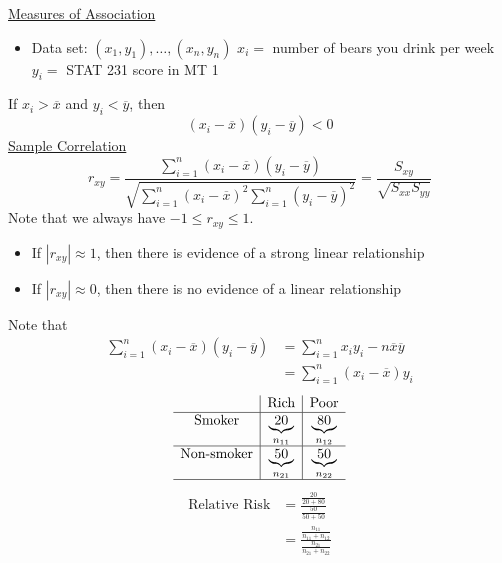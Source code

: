 \underline{Measures of Association}
\begin{itemize}
    \item Data set: $ (x_1,y_1),\ldots ,(x_n,y_n) $
          \subitem $ x_i= $ number of bears you drink per week
          \subitem $ y_i= $ STAT 231 score in MT 1
\end{itemize}
If $ x_i>\overline{x} $ and $ y_i<\overline{y} $, then
\[ (x_i-\overline{x})(y_i-\overline{y})<0 \]
\underline{Sample Correlation}
\[ r_{xy}=\frac{\sum\limits_{i=1}^{n} (x_i-\overline{x})(y_i-\overline{y})}{
        \sqrt{\sum\limits_{i=1}^{n} (x_i-\overline{x})^2\sum\limits_{i=1}^{n}
            (y_i-\overline{y})^2}
    }=\frac{S_{xy}}{\sqrt{S_{xx}S_{yy}}}  \]
Note that we always have $ -1\leqslant r_{xy}\leqslant 1 $.
\begin{itemize}
    \item If $ |r_{xy}|\approx 1 $, then there is evidence of a strong linear relationship
    \item If $ |r_{xy}|\approx 0 $, then there is no evidence of a linear relationship
\end{itemize}
Note that
\begin{align*}
    \sum\limits_{i=1}^{n} (x_i-\overline{x})(y_i-\overline{y})
     & =\sum\limits_{i=1}^{n} x_iy_i-n\overline{x}\overline{y} \\
     & =\sum\limits_{i=1}^{n} (x_i-\overline{x})y_i
\end{align*}
\[ \begin{array}{c|c|c}
                          & \text{Rich}              & \text{Poor}              \\
        \hline
        \text{Smoker}     & \underbrace{20}_{n_{11}} & \underbrace{80}_{n_{12}} \\
        \hline
        \text{Non-smoker} & \underbrace{50}_{n_{21}} & \underbrace{50}_{n_{22}} \\
        \hline
    \end{array} \]
\begin{align*}
    \text{Relative Risk}
     & =\frac{\frac{20}{20+80}}{\frac{50}{50+50}}                         \\
     & =\frac{\frac{n_{11}}{n_{11}+n_{12}}}{\frac{n_{21}}{n_{21}+n_{22}}}
\end{align*}
